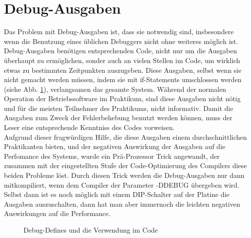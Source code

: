 \section{Debug-Ausgaben \label{impl_debug}}
Das Problem mit Debug-Ausgaben ist, dass sie notwendig sind, insbesondere wenn die Benutzung eines üblichen Debuggers nicht
ohne weiteres möglich ist. Debug-Ausgaben benötigen entsprechenden Code, nicht nur um die Ausgaben überhaupt zu ermöglichen,
sonder auch an vielen Stellen im Code, um wirklich etwas zu bestimmten Zeitpunkten auszugeben. Diese Ausgaben, selbst wenn
sie nicht gemacht werden müssen, indem sie mit if-Statements umschlossen werden (siehe Abb. \ref{debug_trick}), verlangsamen
das gesamte System. Während der normalen Operation der Betriebssoftware im Praktikum, sind diese Ausgaben nicht nötig und für
die meisten Teilnehmer des Praktikums, nicht informativ. Damit die Ausgaben zum Zweck der Fehlerbehebung benutzt werden können,
muss der Leser eine entsprechende Kenntniss des Codes vorweisen.\\
Aufgrund dieser fragwürdigen Hilfe, die diese Ausgaben einem durchschnittlichen Praktikanten bieten, und der negativen Auswirkung
der Ausgaben auf die Perfomance des Systems, wurde ein Prä-Prozessor Trick angewandt, der zusammen mit der eingestellten Stufe
der Code-Optimierung des Compilers diese beiden Probleme löst. Durch diesen Trick werden die Debug-Ausgaben nur dann mitkompiliert,
wenn dem Compiler der Parameter -DDEBUG übergeben wird. Selbst dann ist es noch möglich mit einem DIP-Schalter auf der Platine
die Ausgaben auszuschalten, dann hat man aber immernoch die leichten negativen Auswirkungen auf die Performance.
\begin{figure}[htb]
 \centering
 \caption{\label{debug_trick}Debug-Defines und die Verwendung im Code}
\end{figure}
